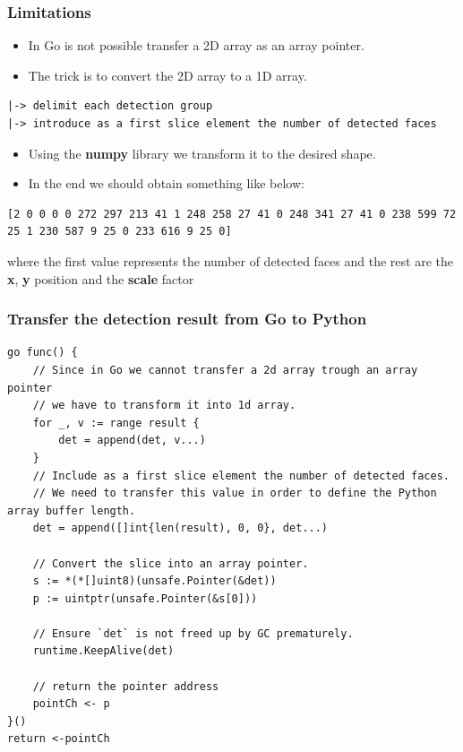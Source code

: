\documentclass[9pt]{beamer}
\begin{document}
\begin{frame}[fragile]
\frametitle{Limitations}


\begin{itemize}
\item In Go is not possible transfer a 2D array as an array pointer.
\item The trick is to convert the 2D array to a 1D array.
\end{itemize}


\begin{verbatim}
|-> delimit each detection group
|-> introduce as a first slice element the number of detected faces

\end{verbatim}


\begin{itemize}
\item Using the \textbf{numpy} library we transform it to the desired shape.
\item In the end we should obtain something like below:
\end{itemize}


\begin{verbatim}
[2 0 0 0 0 272 297 213 41 1 248 258 27 41 0 248 341 27 41 0 238 599 72 25 1 230 587 9 25 0 233 616 9 25 0]

\end{verbatim}


where the first value represents the number of detected faces and the rest are the \textbf{x}, \textbf{y} position and the \textbf{scale} factor



\end{frame}

\begin{frame}[fragile]
\frametitle{Transfer the detection result from Go to Python}



\begin{verbatim}
go func() {
    // Since in Go we cannot transfer a 2d array trough an array pointer
    // we have to transform it into 1d array.
    for _, v := range result {
        det = append(det, v...)
    }
    // Include as a first slice element the number of detected faces.
    // We need to transfer this value in order to define the Python array buffer length.
    det = append([]int{len(result), 0, 0}, det...)

    // Convert the slice into an array pointer.
    s := *(*[]uint8)(unsafe.Pointer(&det))
    p := uintptr(unsafe.Pointer(&s[0]))

    // Ensure `det` is not freed up by GC prematurely.
    runtime.KeepAlive(det)

    // return the pointer address
    pointCh <- p
}()
return <-pointCh

\end{verbatim}



\end{frame}
\end{document}
